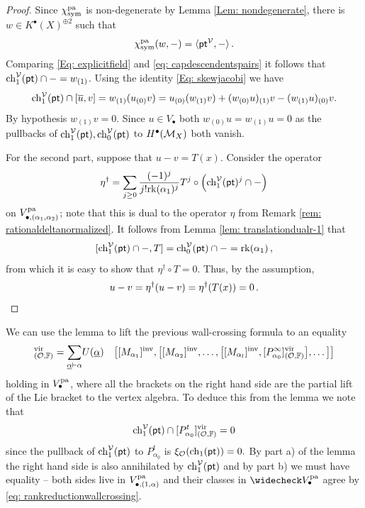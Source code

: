 \documentclass[a4paper, 12pt]{amsart}
\begin{document}
\begin{proof}
Since $\chi_{\text{sym}}^{\mathop{\rm pa}\nolimits}$ is non-degenerate by Lemma \ref{Lem: nondegenerate}, there is $w\in K^\bullet(X)^{\oplus 2}$ such that \[\chi_{\text{sym}}^{\mathop{\rm pa}\nolimits}(w, -)=\langle {\mathsf{pt}}^{\mathcal V}, -\rangle\,.\]
Comparing \eqref{Eq: explicitfield} and \eqref{eq: capdescendentspairs} it follows that $\mathrm{ch}_1^{\mathcal V}({\mathsf{pt}})\cap -=w_{(1)}$. Using the identity \eqref{Eq: skewjacobi} we have
\[\mathrm{ch}_1^{\mathcal V}({\mathsf{pt}})\cap [\overline u, v]=w_{(1)}(u_{(0)}v)=u_{(0)}(w_{(1)} v)+(w_{(0)} u)_{(1)} v-(w_{(1)} u)_{(0)} v.\]
By hypothesis $w_{(1)} v=0$. Since $u\in V_\bullet$ both $w_{(0)} u=w_{(1)} u=0$ as the pullbacks of $\mathrm{ch}_1^{\mathcal V}({\mathsf{pt}}), \mathrm{ch}_0^{\mathcal V}({\mathsf{pt}})$ to $H^\bullet({\mathcal M}_X)$ both vanish.

For the second part, suppose that $u-v=T(x)$. Consider the operator
\[\eta^\dagger=\sum_{j\geq 0}\frac{(-1)^j}{j!\mathrm{rk}(\alpha_1)^j}T^j\circ \left(\mathrm{ch}_1^{\mathcal V}({\mathsf{pt}})^j\cap -\right)\]
on $V_{\bullet, (\alpha_1, \alpha_2)}^{\mathop{\rm pa}\nolimits}$; note that this is dual to the operator $\eta$ from Remark \ref{rem: rationaldeltanormalized}. It follows from Lemma \ref{lem: translationdualr-1} that
\[[\mathrm{ch}_1^{\mathcal V}({\mathsf{pt}})\cap -, T]=\mathrm{ch}_0^{\mathcal V}({\mathsf{pt}})\cap -=\mathrm{rk}(\alpha_1)\,,\]
from which it is easy to show that $\eta^\dagger\circ T=0$. Thus, by the assumption,
\[u-v=\eta^\dagger(u-v)=\eta^\dagger(T(x))=0\,.\qedhere\]




\end{proof}

We can use the lemma to lift the previous wall-crossing formula to an equality
\begin{align}[P_{\alpha}^{0+}]^\vir_{(\CO,\BF)}=\sum_{\underline{\alpha} \vdash \alpha
}&U(\underline{\alpha})
&\big[[M_{\alpha_1}]^\inva,\big[[M_{\alpha_2}]^\inva,\ldots, \big[[M_{\alpha_l}]^\inva,[P_{\alpha_0}^\infty]^\vir_{(\CO,\BF)}  \big],\ldots \big]\big]
\label{eq: wallcrossinglift}
\end{align}
holding in $V_\bullet^{\mathop{\rm pa}\nolimits}$, where all the brackets on the right hand side are the partial lift of the Lie bracket to the vertex algebra. To deduce this from the lemma we note that
\[\mathrm{ch}_1^{\mathcal V}({\mathsf{pt}})\cap [P_{\alpha_0}^t]^{\mathrm{vir}}_{({\mathcal O},{\mathbb{F}})}=0\]
since the pullback of $\mathrm{ch}_1^{\mathcal V}({\mathsf{pt}})$ to $P_{\alpha_0}^t$ is $\xi_{\mathcal O}(\mathrm{ch}_1({\mathsf{pt}}))=0.$ By part a) of the lemma the right hand side is also annihilated by $\mathrm{ch}_1^{\mathcal V}({\mathsf{pt}})$ and by part b) we must have equality -- both sides live in $V^{\mathop{\rm pa}\nolimits}_{\bullet, (1, \alpha)}$ and their classes in $\widecheck V_\bullet^{\pa}$ agree by \eqref{eq: rankreductionwallcrossing}. 
\end{document}
